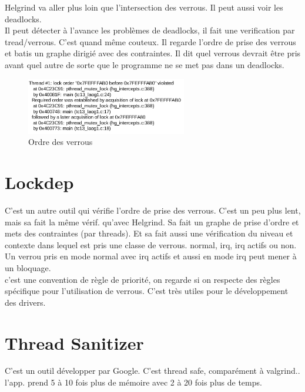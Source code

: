 \documentclass[oneside]{book}
\begin{document}
Helgrind va aller plus loin que l'intersection des verrous. Il peut aussi voir les deadlocks.\\

Il peut détecter à l'avance les problèmes de deadlocks, il fait une verification par tread/verrous. C'est quand même couteux. Il regarde l'ordre de prise des verrous et batis un graphe dirigié avec des contraintes. Il dit quel verrous devrait être pris avant quel autre de sorte que le programme ne se met pas dans un deadlocks. \\

\begin{figure}[!ht]
\centering
\includegraphics[width = 7cm]{ordre_verrous.png}
\caption{Ordre des verrous}
\label{fig:ordre_verrous}
\end{figure}

\section{Lockdep}
C'est un autre outil qui vérifie l'ordre de prise des verrous. C'est un peu plus lent, mais sa fait la même vérif. qu'avec Helgrind. Sa fait un graphe de prise d'ordre et mets des contraintes (par threads). Et sa fait aussi une vérification du niveau et contexte dans lequel est pris une classe de verrous. normal, irq, irq actifs ou non. Un verrou pris en
mode normal avec irq actifs et aussi en mode irq peut mener à
un bloquage.\\

c'est une convention de règle de priorité, on regarde si on respecte des règles spécifique pour l'utilisation de verrous. C'est très utiles pour le développement des drivers.\\

\section{Thread Sanitizer}

C'est un outil développer par Google. C'est thread safe, comparément à valgrind..\\

l'app. prend 5 à 10 fois plus de mémoire avec 2 à 20 fois plus de temps.\\
\end{document}
